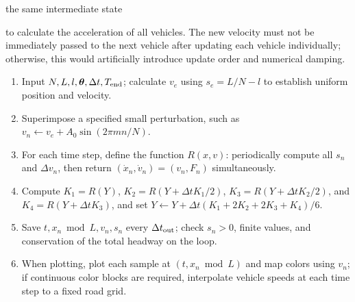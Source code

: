 \documentclass[11pt,a4paper,openany]{book}
\numberwithin{equation}{chapter}
\numberwithin{figure}{chapter}
\numberwithin{table}{chapter}
\newcommand{\cnemph}[1]{{\quotefont #1}}
\begin{document}
\cnemph{the same intermediate state}




to calculate the acceleration of all vehicles. The new velocity must not be immediately passed to the next vehicle after updating each vehicle individually; otherwise, this would artificially introduce update order and numerical damping.










\begin{tcolorbox}[experimentbox,title=\textbf{Pseudocode for Microscale Circuit Simulation (RK4)}]
\small
\begin{enumerate}[leftmargin=1.7em,itemsep=2pt]
\item




 Input $N,L,l,\boldsymbol\theta,\Delta t,T_{\rm end}$; calculate $v_e$ using $s_e=L/N-l$ to establish uniform position and velocity.







\item




 Superimpose a specified small perturbation, such as $v_n\leftarrow v_e+A_0\sin(2\pi mn/N)$.







\item




For each time step, define the function $R(x,v)$: periodically compute all $s_n$ and $\Delta v_n$, then return $(\dot x_n,\dot v_n)=(v_n,F_n)$ simultaneously.


\item Compute $K_1=R(Y)$, $K_2=R(Y+\Delta tK_1/2)$, $K_3=R(Y+\Delta tK_2/2)$, and $K_4=R(Y+\Delta tK_3)$, and set $Y\leftarrow Y+\Delta t(K_1+2K_2+2K_3+K_4)/6$.







\item




 Save $t,x_n\bmod L,v_n,s_n$ every $\Delta t_{\rm out}$; check $s_n>0$, finite values, and conservation of the total headway on the loop.







\item




When plotting, plot each sample at $(t,x_n\bmod L)$ and map colors using $v_n$; if continuous color blocks are required, interpolate vehicle speeds at each time step to a fixed road grid.







\end{enumerate}
\end{tcolorbox}
\end{document}
